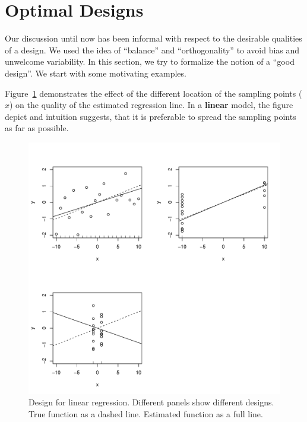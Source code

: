 \section{Optimal Designs}

Our discussion until now has been informal with respect to the desirable qualities of a design. 
We used the idea of ``balance'' and ``orthogonality'' to avoid bias and unwelcome variability.
In this section, we try to formalize the notion of a ``good design''.
We start with some motivating examples.


\begin{example}
\label{eg:design_linear}
Figure~\ref{fig:design_linear} demonstrates the effect of the different location of the sampling points ($x$) on the quality of the estimated regression line.
In a \textbf{linear} model, the figure depict and intuition suggests, that it is preferable to spread the sampling points as far as possible.
\begin{figure}[h]
\centering
\includegraphics[height=0.3\textheight]{art/linear}
\caption[Design for Linear Models]{
Design for linear regression. Different panels show different designs. True function as a dashed line. Estimated function as a full line.}
\label{fig:design_linear}
\end{figure}
\end{example}





